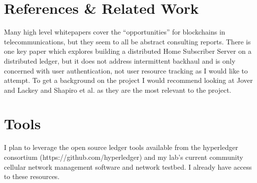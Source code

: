 \documentclass[sigconf]{acmart}
\begin{document}
\section{References \& Related Work}
Many high level whitepapers cover the ``opportunities'' for
blockchains in
telecommunications\cite{BabuBlockchainTelco2016}\cite{BubleyBlockchainTelecomsIndustry2017}\cite{BaeOperatingmiddledigital},
but they seem to all be abstract consulting reports. There is one key
paper\cite{JoverdHSSdistributedPeertoPeer2016a} which explores
building a distributed Home Subscriber Server on a distributed ledger,
but it does not address intermittent backhaul and is only concerned
with user authentication, not user resource tracking as I would like
to attempt. To get a background on the project I would recommend
looking at Jover and Lackey \cite{JoverdHSSdistributedPeertoPeer2016a}
and Shapiro et al.\cite{ShapiroConflictfreereplicateddata2011} as they
are the most relevant to the project.

\section{Tools}

I plan to leverage the open source ledger tools available from the
hyperledger consortium (https://github.com/hyperledger) and my lab's
current community cellular network management
software\cite{Heimerllongitudinalstudylocal2015} and network
testbed. I already have access to these resources.





\end{document}
